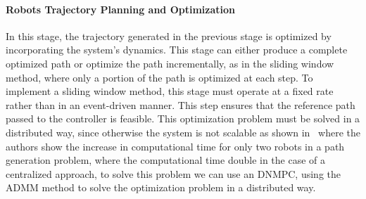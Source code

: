 \paragraph{Robots Trajectory Planning and Optimization} 
In this stage, the trajectory generated in the previous stage is optimized by incorporating the system's dynamics. This stage can either produce a complete optimized path or optimize the path incrementally, as in the sliding window method, where only a portion of the path is optimized at each step. To implement a sliding window method, this stage must operate at a fixed rate rather than in an event-driven manner. This step ensures that the reference path passed to the controller is feasible. This optimization problem must be solved in a distributed way, since otherwise the system is not scalable as shown in~\cite{correia2021payload} where the authors show the increase in computational time for only two robots in a path generation problem, where the computational time double in the case of a centralized approach, to solve this problem we can use an DNMPC, using the ADMM method to solve the optimization problem in a distributed way.

